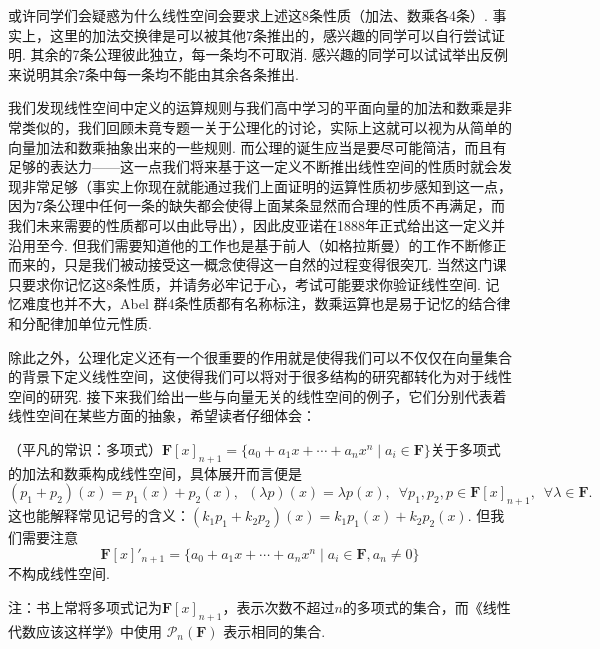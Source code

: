 或许同学们会疑惑为什么线性空间会要求上述这8条性质（加法、数乘各4条）. 事实上，这里的加法交换律是可以被其他7条推出的，感兴趣的同学可以自行尝试证明. 其余的7条公理彼此独立，每一条均不可取消. 感兴趣的同学可以试试举出反例来说明其余7条中每一条均不能由其余各条推出.

我们发现线性空间中定义的运算规则与我们高中学习的平面向量的加法和数乘是非常类似的，我们回顾未竟专题一关于公理化的讨论，实际上这就可以视为从简单的向量加法和数乘抽象出来的一些规则. 而公理的诞生应当是要尽可能简洁，而且有足够的表达力——这一点我们将来基于这一定义不断推出线性空间的性质时就会发现非常足够（事实上你现在就能通过我们上面证明的运算性质初步感知到这一点，因为7条公理中任何一条的缺失都会使得上面某条显然而合理的性质不再满足，而我们未来需要的性质都可以由此导出），因此皮亚诺在1888年正式给出这一定义并沿用至今. 但我们需要知道他的工作也是基于前人（如格拉斯曼）的工作不断修正而来的，只是我们被动接受这一概念使得这一自然的过程变得很突兀. 当然这门课只要求你记忆这8条性质，并请务必牢记于心，考试可能要求你验证线性空间. 记忆难度也并不大，Abel 群4条性质都有名称标注，数乘运算也是易于记忆的结合律和分配律加单位元性质.

除此之外，公理化定义还有一个很重要的作用就是使得我们可以不仅仅在向量集合的背景下定义线性空间，这使得我们可以将对于很多结构的研究都转化为对于线性空间的研究. 接下来我们给出一些与向量无关的线性空间的例子，它们分别代表着线性空间在某些方面的抽象，希望读者仔细体会：

\begin{example}{}{}
    （平凡的常识：多项式）$\mathbf{F}[x]_{n+1}=\{a_0+a_1x+\cdots+a_nx^n \mid a_i\in\mathbf{F}\}$关于多项式的加法和数乘构成线性空间，具体展开而言便是
    \[(p_1+p_2)(x)=p_1(x)+p_2(x),\enspace(\lambda p)(x)=\lambda p(x),\enspace\forall p_1,p_2,p\in\mathbf{F}[x]_{n+1},\enspace\forall \lambda\in\mathbf{F}.\]
    这也能解释常见记号的含义：$(k_1p_1+k_2p_2)(x)=k_1p_1(x)+k_2p_2(x)$.
    但我们需要注意
    \[\mathbf{F}[x]'_{n+1}=\{a_0+a_1x+\cdots+a_nx^n \mid a_i\in\mathbf{F}, a_n\neq 0\}\]
    不构成线性空间.

    注：书上常将多项式记为$\mathbf{F}[x]_{n+1}$，表示次数不超过$n$的多项式的集合，而《线性代数应该这样学》中使用 $\mathcal{P}_n(\mathbf{F})$ 表示相同的集合.
\end{example}

